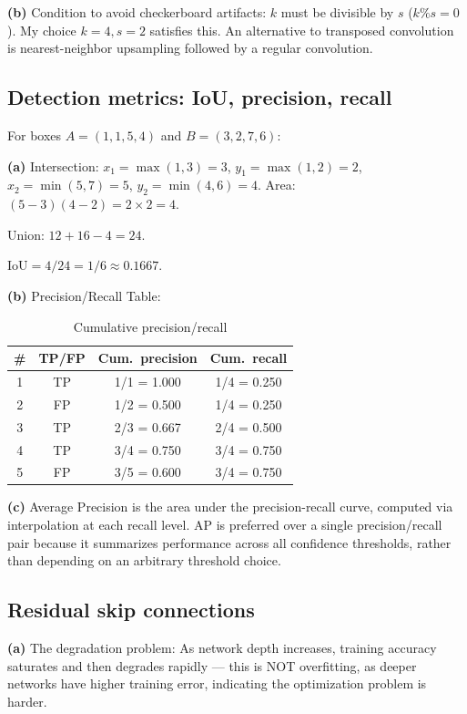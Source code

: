 \documentclass[10pt,twocolumn,letterpaper]{article}
\begin{document}
\textbf{(b)} Condition to avoid checkerboard artifacts: $k$ must be divisible by
$s$ ($k \% s = 0$). My choice $k=4, s=2$ satisfies this. An alternative to
transposed convolution is nearest-neighbor upsampling followed by a regular
convolution.

\subsection{Detection metrics: IoU, precision, recall}

For boxes $A=(1,1,5,4)$ and $B=(3,2,7,6)$:

\textbf{(a)} Intersection: $x_1=\max(1,3)=3$, $y_1=\max(1,2)=2$,
$x_2=\min(5,7)=5$, $y_2=\min(4,6)=4$.
Area: $(5-3)(4-2) = 2 \times 2 = 4$.

Union: $12 + 16 - 4 = 24$.

$\mathrm{IoU} = 4/24 = 1/6 \approx 0.1667$.

\textbf{(b)} Precision/Recall Table:

\begin{table}[t]
\caption{Cumulative precision/recall}
\label{tab:pr}
\centering
\begin{tabular}{cccc}
\toprule
\# & TP/FP & Cum.\ precision & Cum.\ recall \\
\midrule
1 & TP & 1/1 = 1.000 & 1/4 = 0.250 \\
2 & FP & 1/2 = 0.500 & 1/4 = 0.250 \\
3 & TP & 2/3 = 0.667 & 2/4 = 0.500 \\
4 & TP & 3/4 = 0.750 & 3/4 = 0.750 \\
5 & FP & 3/5 = 0.600 & 3/4 = 0.750 \\
\bottomrule
\end{tabular}
\end{table}

\textbf{(c)} Average Precision is the area under the precision-recall curve,
computed via interpolation at each recall level. AP is preferred over a single
precision/recall pair because it summarizes performance across all confidence
thresholds, rather than depending on an arbitrary threshold choice.

\subsection{Residual skip connections}

\textbf{(a)} The degradation problem: As network depth increases, training
accuracy saturates and then degrades rapidly — this is NOT overfitting, as
deeper networks have higher training error, indicating the optimization problem
is harder.
\end{document}
